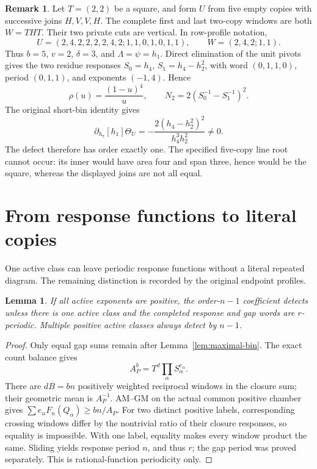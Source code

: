 \documentclass[11pt,a4paper]{amsart}
\numberwithin{equation}{section}
\theoremstyle{plain}
\newtheorem{lemma}[theorem]{Lemma}
\theoremstyle{definition}
\newtheorem{remark}[theorem]{Remark}
\begin{document}
\begin{remark}\label{rem:square-word}
Let \(T=(2,2)\) be a square, and form \(U\) from five empty copies with successive joins \(H,V,V,H\).  The complete first and last two-copy windows are both \(W=THT\).  Their two private cuts are vertical.  In row-profile notation,
\[
 U=(2,4,2,2,2,2,4,2;1,1,0,1,0,1,1),\qquad
 W=(2,4,2;1,1).
\]
Thus \(b=5\), \(v=2\), \(\delta=3\), and \(\Lambda=\psi=h_1\).  Direct elimination of the unit pivots gives the two residue responses
\(S_0=h_4\), \(S_1=h_4-h_2^2\), with word \((0,1,1,0)\), period \((0,1,1)\), and exponents \((-1,4)\).  Hence
\[
 \rho(u)=\frac{(1-u)^4}{u},\qquad
 N_2=2(S_0^{-1}-S_1^{-1})^2.
\]
The original short-bin identity gives
\[
 \partial_{h_7}[h_1]\Theta_U
 =-\frac{2(h_4-h_2^2)^2}{h_4^3h_2^2}\ne0.
\]
The defect therefore has order exactly one.  The specified five-copy line root cannot occur: its inner would have area four and span three, hence would be the square, whereas the displayed joins are not all equal.
\end{remark}

\section{From response functions to literal copies}\label{sec:one-active}

One active class can leave periodic response functions without a literal repeated diagram.  The remaining distinction is recorded by the original endpoint profiles.

\begin{lemma}\label{lem:positive-support}
If all active exponents are positive, the order-\(n-1\) coefficient detects unless there is one active class and the completed response and gap words are \(r\)-periodic.  Multiple positive active classes always detect by \(n-1\).
\end{lemma}
\begin{proof}
Only equal gap sums remain after Lemma~\ref{lem:maximal-bin}.  The exact count balance gives
\[
 A_P^b=T^d\prod_\alpha S_\alpha^{e_\alpha}.
\]
There are \(dB=bn\) positively weighted reciprocal windows in the closure sum; their geometric mean is \(A_P^{-1}\).  AM--GM on the actual common positive chamber gives
\(\sum e_\alpha F_n(Q_\alpha)\ge bn/A_P\).
For two distinct positive labels, corresponding crossing windows differ by the nontrivial ratio of their closure responses, so equality is impossible.  With one label, equality makes every window product the same.  Sliding yields response period \(n\), and thus \(r\); the gap period was proved separately.  This is rational-function periodicity only.
\end{proof}
\end{document}
